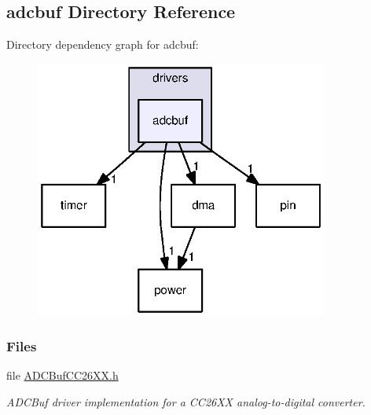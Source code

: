\subsection{adcbuf Directory Reference}
\label{dir_5c9ebf302ce622289e13a853fdf90347}
Directory dependency graph for adcbuf\+:
\nopagebreak
\begin{figure}[H]
\begin{center}
\leavevmode
\includegraphics[width=273pt]{dir_5c9ebf302ce622289e13a853fdf90347_dep}
\end{center}
\end{figure}
\subsubsection*{Files}
\begin{DoxyCompactItemize}
\item 
file \hyperlink{_a_d_c_buf_c_c26_x_x_8h}{A\+D\+C\+Buf\+C\+C26\+X\+X.\+h}
\begin{DoxyCompactList}\small\item\em A\+D\+C\+Buf driver implementation for a C\+C26\+X\+X analog-\/to-\/digital converter. \end{DoxyCompactList}\end{DoxyCompactItemize}
